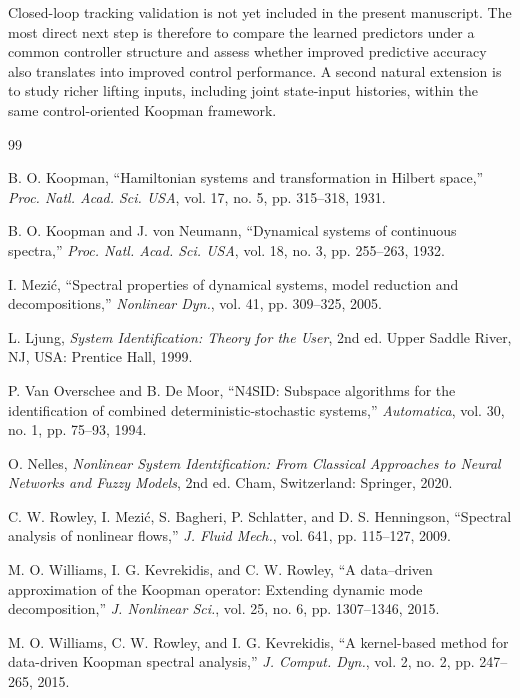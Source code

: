 \documentclass[journal]{IEEEtran}
\begin{document}
Closed-loop tracking validation is not yet included in the present manuscript. The most direct next step is therefore to compare the learned predictors under a common controller structure and assess whether improved predictive accuracy also translates into improved control performance. A second natural extension is to study richer lifting inputs, including joint state-input histories, within the same control-oriented Koopman framework.

\begin{thebibliography}{99}

B. O. Koopman, ``Hamiltonian systems and transformation in Hilbert space,'' \emph{Proc. Natl. Acad. Sci. USA}, vol. 17, no. 5, pp. 315--318, 1931.

B. O. Koopman and J. von Neumann, ``Dynamical systems of continuous spectra,'' \emph{Proc. Natl. Acad. Sci. USA}, vol. 18, no. 3, pp. 255--263, 1932.

I. Mezi\'c, ``Spectral properties of dynamical systems, model reduction and decompositions,'' \emph{Nonlinear Dyn.}, vol. 41, pp. 309--325, 2005.

L. Ljung, \emph{System Identification: Theory for the User}, 2nd ed. Upper Saddle River, NJ, USA: Prentice Hall, 1999.

P. Van Overschee and B. De Moor, ``N4SID: Subspace algorithms for the identification of combined deterministic-stochastic systems,'' \emph{Automatica}, vol. 30, no. 1, pp. 75--93, 1994.

O. Nelles, \emph{Nonlinear System Identification: From Classical Approaches to Neural Networks and Fuzzy Models}, 2nd ed. Cham, Switzerland: Springer, 2020.

C. W. Rowley, I. Mezi\'c, S. Bagheri, P. Schlatter, and D. S. Henningson, ``Spectral analysis of nonlinear flows,'' \emph{J. Fluid Mech.}, vol. 641, pp. 115--127, 2009.

M. O. Williams, I. G. Kevrekidis, and C. W. Rowley, ``A data--driven approximation of the Koopman operator: Extending dynamic mode decomposition,'' \emph{J. Nonlinear Sci.}, vol. 25, no. 6, pp. 1307--1346, 2015.

M. O. Williams, C. W. Rowley, and I. G. Kevrekidis, ``A kernel-based method for data-driven Koopman spectral analysis,'' \emph{J. Comput. Dyn.}, vol. 2, no. 2, pp. 247--265, 2015.


\end{thebibliography}
\end{document}
